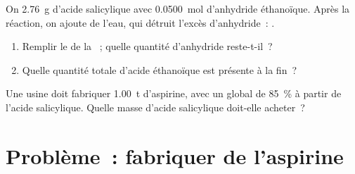 \begin{exercise}[$\star\star\star$]\label{exo:g10:synthesis-yield:14}
On  \qty{2.76}{g} d'acide salicylique avec \qty{0.0500}{mol}
d'anhydride éthanoïque. Après la réaction, on ajoute de l'eau, qui
détruit l'excès d'anhydride~: .
\begin{enumerate}
  \item Remplir le  de la ~; quelle quantité
        d'anhydride reste-t-il~?
  \item Quelle quantité totale d'acide éthanoïque est présente à la
        fin~?
\end{enumerate}
\end{exercise}

\begin{exercise}[$\star\star\star$]\label{exo:g10:synthesis-yield:15}
Une usine doit fabriquer \qty{1.00}{t} d'aspirine, avec un 
global de \qty{85}{\percent} à partir de l'acide salicylique. Quelle
masse d'acide salicylique doit-elle acheter~?
\end{exercise}

\section{Problème~: fabriquer de l'aspirine}

